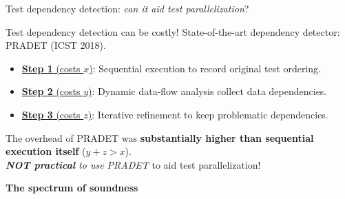 \documentclass{beamer}
\begin{document}
\begingroup
\renewcommand{\disp}{}
\begin{frame}
	\begin{center}
		{\rsm Test dependency detection}: \textit{can it aid test parallelization}? 
	\end{center}
\end{frame}
\endgroup
\addtocounter{framenumber}{-1}

\begin{frame}{Test dependency detection can be costly!}
	State-of-the-art dependency detector: PRADET (ICST 2018).
	\vfill
	\begin{itemize}
		\fontsize{11}{11}\selectfont
		\item[]{\underline{\textbf{Step 1} (costs $x$)}: {\rsm Sequential execution} to record original test ordering.}\pause
		\item[]{\underline{\textbf{Step 2} (costs $y$)}: {\rsm Dynamic data-flow analysis} collect data dependencies.}\pause
		\item[]{\underline{\textbf{Step 3} (costs $z$)}: {\rsm Iterative refinement} to keep problematic dependencies.}\pause
	\end{itemize}
	\begin{center}
		\begin{tcolorbox}
			The overhead of {\rsm PRADET} was {\color{red} \textbf{substantially higher than sequential execution itself}} ($y+z>{x}$).\\\textit{\textbf{NOT practical} to use PRADET} to aid test parallelization!
		\end{tcolorbox}
	\end{center}
\end{frame}

\begingroup
\renewcommand{\disp}{}
\begin{frame}
	\begin{center}
		{\rsm \textbf{The spectrum of soundness}} 
	\end{center}
\end{frame}
\endgroup
\addtocounter{framenumber}{-1}
\end{document}
